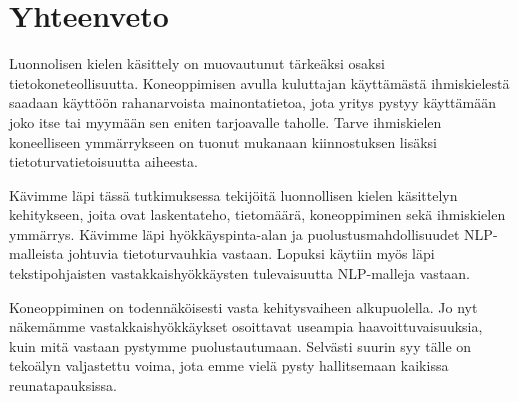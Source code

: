 \chapter{Yhteenveto\label{conclusions}}

Luonnolisen kielen käsittely on muovautunut tärkeäksi osaksi tietokoneteollisuutta. Koneoppimisen avulla kuluttajan käyttämästä ihmiskielestä saadaan käyttöön rahanarvoista mainontatietoa, jota yritys pystyy käyttämään joko itse tai myymään sen eniten tarjoavalle taholle. Tarve ihmiskielen koneelliseen ymmärrykseen on tuonut mukanaan kiinnostuksen lisäksi tietoturvatietoisuutta aiheesta.

Kävimme läpi tässä tutkimuksessa tekijöitä luonnollisen kielen käsittelyn kehitykseen, joita ovat laskentateho, tietomäärä, koneoppiminen sekä ihmiskielen ymmärrys. Kävimme läpi hyökkäyspinta-alan ja puolustusmahdollisuudet NLP-malleista johtuvia tietoturvauhkia vastaan. Lopuksi käytiin myös läpi tekstipohjaisten vastakkaishyökkäysten tulevaisuutta NLP-malleja vastaan.

Koneoppiminen on todennäköisesti vasta kehitysvaiheen alkupuolella. Jo nyt näkemämme vastakkaishyökkäykset osoittavat useampia haavoittuvaisuuksia, kuin mitä vastaan pystymme puolustautumaan. Selvästi suurin syy tälle on tekoälyn valjastettu voima, jota emme vielä pysty hallitsemaan kaikissa reunatapauksissa.